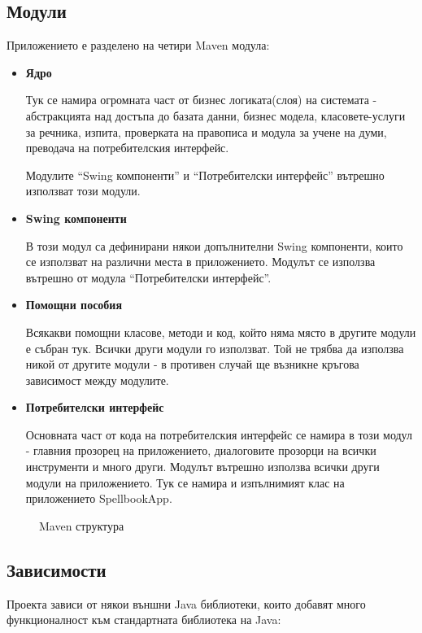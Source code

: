 \subsection{Модули}
Приложението е разделено на четири Maven модула:
\begin{itemize}
\item \textbf{Ядро}

Тук се намира огромната част от бизнес логиката(слоя) на системата -
абстракцията над достъпа до базата данни, бизнес модела,
класовете-услуги за речника, изпита, проверката на правописа и модула
за учене на думи, преводача на потребителския интерфейс.

Модулите "`Swing компоненти"' и "`Потребителски интерфейс"' вътрешно
използват този модули. 
\item \textbf{Swing компоненти}

В този модул са дефинирани някои допълнителни Swing компоненти, които
се използват на различни места в приложението. Модулът се използва
вътрешно от модула "`Потребителски интерфейс"'.
\item \textbf{Помощни пособия}

Всякакви помощни класове, методи и код, който няма място в другите
модули е събран тук. Всички други модули го използват. Той не трябва
да използва никой от другите модули - в противен случай ще възникне
кръгова зависимост между модулите.
\item \textbf{Потребителски интерфейс}

Основната част от кода на потребителския интерфейс се намира в този
модул - главния прозорец на приложението, диалоговите прозорци на
всички инструменти и много други. Модулът вътрешно използва всички
други модули на приложението. Тук се намира и изпълнимият клас на
приложението SpellbookApp. 
\end{itemize}
\begin{figure}[htbp]
  \caption{Maven структура}
  \centering
\end{figure}
    
\subsection{Зависимости}
Проекта зависи от някои външни Java библиотеки, които добавят много
функционалност към стандартната библиотека на Java:


